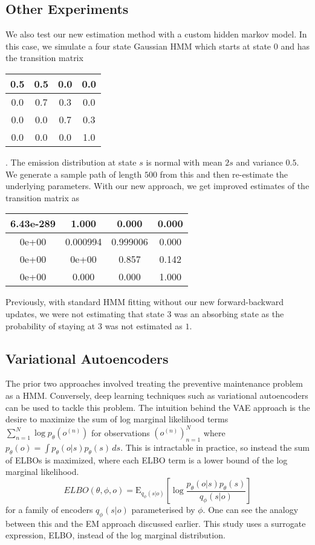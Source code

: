 \documentclass[english]{article}
\numberwithin{equation}{section}
\newcommand{\E}{\mathrm{E}}
\begin{document}
	\subsection*{Other Experiments}
	We also test our new estimation method with a custom hidden markov model. In this case, we simulate a four state Gaussian HMM which starts at state $0$ and has the transition matrix 
	\begin{tabular}{|c|c|c|c|}
		\hline 
		0.5 & 0.5 & 0.0 & 0.0 \\ 
		\hline 
		0.0 & 0.7 & 0.3 & 0.0 \\ 
		\hline 
		0.0 & 0.0 & 0.7 & 0.3 \\ 
		\hline 
		0.0 & 0.0 & 0.0 & 1.0 \\ 
		\hline 
	\end{tabular}. The emission distribution at state $s$ is normal with mean $2s$ and variance $0.5$. We generate a sample path of length $500$ from this and then re-estimate the underlying parameters. With our new approach, we get improved estimates of the transition matrix as
\begin{tabular}{|c|c|c|c|}
	\hline 
	6.43e-289 & 1.000 & 0.000 & 0.000 \\ 
	\hline 
	0e+00 & 0.000994 & 0.999006 & 0.000 \\ 
	\hline 
	0e+00 & 0e+00 & 0.857 & 0.142 \\ 
	\hline 
	0e+00 & 0.000 & 0.000 & 1.000 \\ 
	\hline 
\end{tabular}

Previously, with standard HMM fitting without our new forward-backward updates, we were not estimating that state $3$ was an absorbing state as the probability of staying at $3$ was not estimated as $1$.

	\subsection*{Variational Autoencoders}
	The prior two approaches involved treating the preventive maintenance problem as a HMM. Conversely, deep learning techniques such as variational autoencoders can be used to tackle this problem. The intuition behind the VAE approach is the desire to maximize the sum of log marginal likelihood terms $\sum_{n=1}^N \log p_{\theta}(o^{(n)})$ for observations $(o^{(n)})_{n=1}^N$ where $p_{\theta}(o)=\int p_{\theta}(o|s)p_{\theta}(s)\,ds.$ This is intractable in practice, so instead the sum of ELBOs is maximized, where each ELBO term is a lower bound of the log marginal likelihood.
	$$ELBO(\theta,\phi,o)=\E_{q_{\phi}(s|o)}[\log \frac{p_{\theta}(o|s)p_{\theta}(s)}{q_{\phi}(s|o)}]$$ for a family of encoders $q_{\phi}(s|o)$ parameterised by $\phi$. One can see the analogy between this and the EM approach discussed earlier. This study uses a surrogate expression, ELBO, instead of the log marginal distribution. 
	
\end{document}

